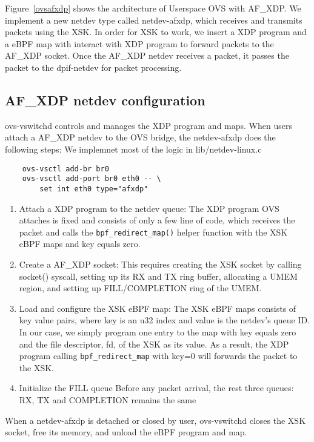 \documentclass[10pt]{sigplanconf}
\begin{document}
Figure~\ref{ovsafxdp} shows the architecture of Userspace OVS with AF\_XDP.
We implement a new netdev type called netdev-afxdp, which receives and transmits
packets using the XSK.
In order for XSK to work, we insert a XDP program and a eBPF map with   
interact with XDP program to forward packets to the AF\_XDP socket.
Once the AF\_XDP netdev receives a packet, it passes the packet to the
dpif-netdev for packet processing.

\subsection{AF\_XDP netdev configuration}
ovs-vswitchd controls and manages the XDP program and maps.
When users attach a AF\_XDP netdev to the OVS bridge, the netdev-afxdp
does the following steps:
We implemnet most of the logic in lib/netdev-linux.c
{
\begin{verbatim}
    ovs-vsctl add-br br0
    ovs-vsctl add-port br0 eth0 -- \
        set int eth0 type="afxdp"
\end{verbatim}
}

\begin{enumerate}
\item Attach a XDP program to the netdev queue:
The XDP program OVS attaches is fixed and consists
of only a few line of code, which receives the packet and
calls the \texttt{bpf\_redirect\_map()} helper function with
the XSK eBPF maps and key equals zero.

\item Create a AF\_XDP socket:
This requires creating the XSK socket by calling socket() syscall,
setting up its RX and TX ring buffer, allocating a UMEM region,
and setting up FILL/COMPLETION ring of the UMEM.

\item Load and configure the XSK eBPF map:
The XSK eBPF maps consists of key value pairs, where key is an u32 index and value is
the netdev's queue ID.  In our case, we simply program one entry to the map with
key equals zero and the file descriptor, fd, of the XSK as its value.
As a result, the XDP program calling \texttt{bpf\_redirect\_map} with key=0 will
forwards the packet to the XSK.

\item Initialize the FILL queue
Before any packet arrival, the rest three queues: RX, TX and COMPLETION
remains the same
\end{enumerate}

When a netdev-afxdp is detached or closed by user,
ovs-vswitchd closes the XSK socket, free its memory, and unload the eBPF program and map.
\end{document}
